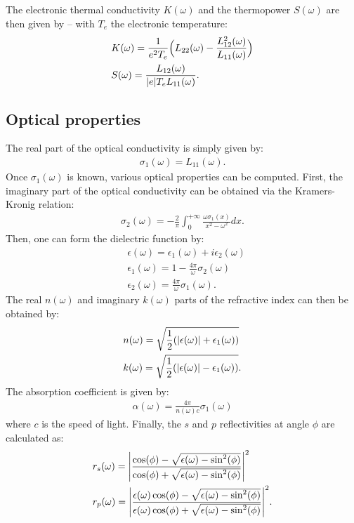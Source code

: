 \documentclass[a4,12pts]{extarticle}
\begin{document}
The electronic thermal conductivity $K(\omega)$ and the thermopower $S(\omega)$ are then given by -- with $T_e$ the electronic temperature:
\begin{align}
&K(\omega)=\frac{1}{e^2T_e}\Big(L_{22}(\omega)-\frac{L_{12}^2(\omega)}{L_{11}(\omega)}\Big) \label{Kth}\\
&S(\omega)=\frac{L_{12}(\omega)}{\abs{e}T_eL_{11}(\omega)}. \label{Sth}
\end{align}

\subsection{Optical properties} \label{Valence}

The real part of the optical conductivity is simply given by:
\begin{align}
\sigma_{1}(\omega)=L_{11}(\omega). \label{sigma1}
\end{align}
Once $\sigma_{1}(\omega)$ is known, various optical properties can be computed.
First, the imaginary part of the optical conductivity can be obtained via the Kramers-Kronig relation:
\begin{align}
\sigma_{2}(\omega)=-\frac{2}{\pi}\int_{0}^{+\infty}\frac{\omega\sigma_{1}(x)}{x^2-\omega^2}dx. \label{sigma2}
\end{align}
Then, one can form the dielectric function by:
\begin{align}
&\epsilon(\omega)=\epsilon_{1}(\omega)+i\epsilon_{2}(\omega) \label{eps}\\
&\epsilon_{1}(\omega)=1-\frac{4\pi}{\omega}\sigma_{2}(\omega) \label{eps1}\\
&\epsilon_{2}(\omega)=\frac{4\pi}{\omega}\sigma_1(\omega). \label{eps2}
\end{align}
The real $n(\omega)$ and imaginary $k(\omega)$ parts of the refractive index can then be obtained by:
\begin{align}
&n(\omega)=\sqrt{\frac{1}{2}(\abs{\epsilon(\omega)}+\epsilon_1(\omega))} \label{nn}\\
&k(\omega)=\sqrt{\frac{1}{2}(\abs{\epsilon(\omega)}-\epsilon_1(\omega))} \label{kk}.
\end{align}
The absorption coefficient is given by:
\begin{align}
\alpha(\omega)=\frac{4\pi}{n(\omega)c}\sigma_1(\omega) \label{abso}
\end{align}
where $c$ is the speed of light. Finally, the $s$ and $p$ reflectivities at angle $\phi$ are calculated as:
\begin{align}
	& r_s(\omega)=\abs{\frac{\cos(\phi)-\sqrt{\epsilon(\omega)-\sin^2(\phi)}}{\cos(\phi)+\sqrt{\epsilon(\omega)-\sin^2(\phi)}}}^2 \label{refl_s}\\
	& r_p(\omega)=\abs{\frac{\epsilon(\omega)\cos(\phi)-\sqrt{\epsilon(\omega)-\sin^2(\phi)}}{\epsilon(\omega)\cos(\phi)+\sqrt{\epsilon(\omega)-\sin^2(\phi)}}}^2. \label{refl_p}
\end{align}
\end{document}
